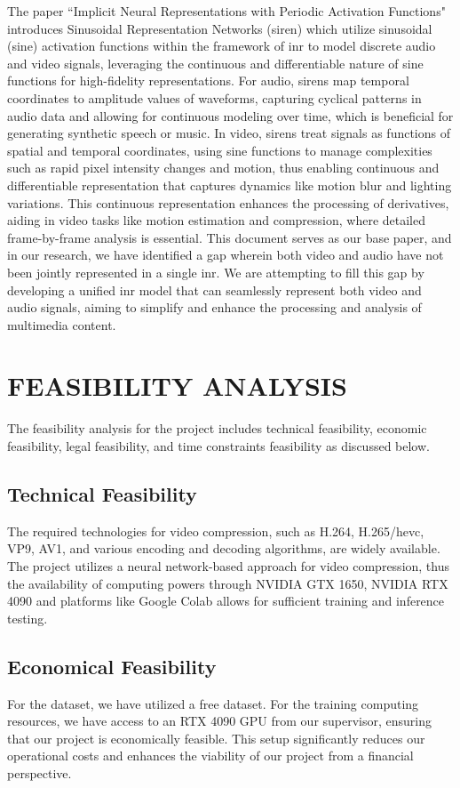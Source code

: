 \documentclass{ioereport}
\begin{document}
The paper ``Implicit Neural Representations with Periodic Activation Functions" \cite{sitzmann2020implicit} introduces Sinusoidal Representation Networks (\gls{siren}) which utilize sinusoidal (sine) activation functions within the framework of \gls{inr} to model discrete audio and video signals, leveraging the continuous and differentiable nature of sine functions for high-fidelity representations. For audio, \gls{siren}s map temporal coordinates to amplitude values of waveforms, capturing cyclical patterns in audio data and allowing for continuous modeling over time, which is beneficial for generating synthetic speech or music. In video, \gls{siren}s treat signals as functions of spatial and temporal coordinates, using sine functions to manage complexities such as rapid pixel intensity changes and motion, thus enabling continuous and differentiable representation that captures dynamics like motion blur and lighting variations. This continuous representation enhances the processing of derivatives, aiding in video tasks like motion estimation and compression, where detailed frame-by-frame analysis is essential. This document serves as our base paper, and in our research, we have identified a gap wherein both video and audio have not been jointly represented in a single \gls{inr}. We are attempting to fill this gap by developing a unified \gls{inr} model that can seamlessly represent both video and audio signals, aiming to simplify and enhance the processing and analysis of multimedia content.

\pagebreak


\section{\MakeUppercase{Feasibility Analysis}}
The feasibility analysis for the project includes technical feasibility, economic feasibility, legal feasibility, and time constraints feasibility as discussed below.
    \subsection{Technical Feasibility}
    The required technologies for video compression, such as H.264, H.265/\gls{hevc}, VP9, AV1, and various encoding and decoding algorithms, are widely available. The project utilizes a neural network-based approach for video compression, thus the availability of computing powers through NVIDIA GTX 1650, NVIDIA RTX 4090 and platforms like Google Colab allows for sufficient training and inference testing.
    \subsection{Economical Feasibility}
    For the dataset, we have utilized a free dataset. For the training computing resources, we have access to an RTX 4090 GPU from our supervisor, ensuring that our project is economically feasible. This setup significantly reduces our operational costs and enhances the viability of our project from a financial perspective.
\end{document}

